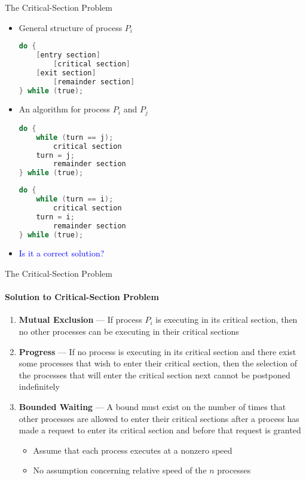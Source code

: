 \documentclass[10pt]{beamer}
\begin{document}
\begin{frame}[fragile]{The Critical-Section Problem}
\begin{itemize}
\item General structure of process $P_i$
\vspace{6pt}\\
\begin{lstlisting}[language=C]
do {
	[entry section]
		[critical section]
	[exit section]
		[remainder section]
} while (true);
\end{lstlisting}
\item An algorithm for process $P_i$ and $P_j$
\vspace{6pt}\\
\begin{minipage}{.49\linewidth}
\begin{lstlisting}[language=C]
do {
    while (turn == j); 
        critical section 
    turn = j; 
        remainder section 
} while (true);
\end{lstlisting}
\end{minipage}
\hspace{13pt}
\begin{minipage}{.49\linewidth}
\begin{lstlisting}[language=C]
do {
    while (turn == i); 
        critical section 
    turn = i; 
        remainder section 
} while (true);
\end{lstlisting}
\end{minipage}
\item \textcolor{blue}{Is it a correct solution?}
\end{itemize}
\end{frame}

\begin{frame}{The Critical-Section Problem}
\framesubtitle{Solution to Critical-Section Problem}
\begin{enumerate}
 
\item \textbf{\alert{Mutual Exclusion}} --- If process $P_i$ is executing in its critical section, then no other processes can be executing in their critical sections
\item \textbf{\alert{Progress}} --- If no process is executing in its critical section and there exist some processes that wish to enter their critical section, then the selection of the processes that will enter the critical section next cannot be postponed indefinitely
\item \textbf{\alert{Bounded Waiting}} --- A bound must exist on the number of times that other processes are allowed to enter their critical sections after a process has made a request to enter its critical section and before that request is granted
\begin{itemize}
\item Assume that each process executes at a nonzero speed 
\item No assumption concerning relative speed of the $n$ processes
\end{itemize}
\end{enumerate}
\end{frame}
\end{document}
